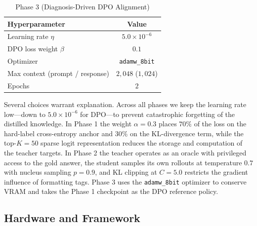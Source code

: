 \begin{table}[htbp]
\vspace{1.5em}

\begin{subtable}{\linewidth}
\centering
\caption{Phase 3 (Diagnosis-Driven DPO Alignment)}
\label{tab:hparams_phase3}
\begin{tabular}{lc}
\hline
\textbf{Hyperparameter} & \textbf{Value} \\ \hline
Learning rate $\eta$    & $5.0 \times 10^{-6}$ \\
DPO loss weight $\beta$ & $0.1$ \\
Optimizer               & \texttt{adamw\_8bit} \\
Max context (prompt / response) & $2{,}048$ ($1{,}024$) \\
Epochs                  & $2$ \\ \hline
\end{tabular}
\end{subtable}
\end{table}

Several choices warrant explanation. Across all phases we keep the learning rate low---down to $5.0 \times 10^{-6}$ for DPO---to prevent catastrophic forgetting of the distilled knowledge. In Phase 1 the weight $\alpha = 0.3$ places $70\%$ of the loss on the hard-label cross-entropy anchor and $30\%$ on the KL-divergence term, while the top-$K=50$ sparse logit representation reduces the storage and computation of the teacher targets. In Phase 2 the teacher operates as an oracle with privileged access to the gold answer, the student samples its own rollouts at temperature $0.7$ with nucleus sampling $p=0.9$, and KL clipping at $C=5.0$ restricts the gradient influence of formatting tags. Phase 3 uses the \texttt{adamw\_8bit} optimizer to conserve VRAM and takes the Phase 1 checkpoint as the DPO reference policy.

\subsection{Hardware and Framework}

